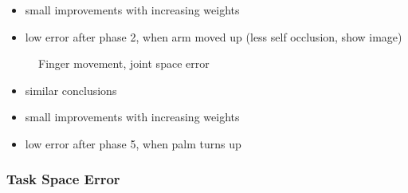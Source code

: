 \begin{itemize}
\item small improvements with increasing weights
\item low error after phase 2, when arm moved up (less self occlusion, show image)
\end{itemize}


\begin{figure}
\centering
{}
\caption{Finger movement, joint space error}
\end{figure}

\begin{itemize}
\item similar conclusions
\item small improvements with increasing weights
\item low error after phase 5, when palm turns up
\end{itemize}

\subsubsection{Task Space Error}

